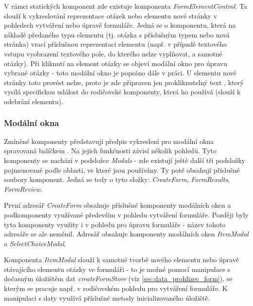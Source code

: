 		V rámci statických komponent zde existuje komponenta \textit{FormElementControl}. Ta slouží k vykreslování reprezentace otázek nebo elementu nové stránky v pohledech vytváření nebo úpravě formuláře. Jedná se o komponentu, která na základě předaného typu elementu (tj. otázka s příslušným typem nebo nová stránka) vrací příslušnou reprezentaci elementu (např. v případě textového vstupu vyobrazení textového pole, do kterého nelze vyplňovat, a samotné otázky). Při kliknutí na element otázky se objeví modální okno pro úpravu vybrané otázky - toto modální okno je popsáno dále v práci. U elementu nové stránky toto provést nelze, proto je zde připraven jen prokliknutelný text , který vysílá specifickou událost do rodičovské komponenty, která ho používá (slouží k odebrání elementu).
	
		\subsubsection{Modální okna} %
		Zmíněné komponenty představují předpis vykreslení pro modální okna spravovaná balíčkem . Na jejich funkčnosti závisí několik pohledů. Tyto komponenty se nachází v podsložce \textit{Modals} - zde existují ještě další tři podsložky pojmenované podle oblasti, ve které jsou používány. Ty poté obsahují příslušné soubory komponent. Jedná se tedy o tyto složky: \textit{CreateForm}, \textit{FormResults}, \textit{FormReview}. 
		
			První adresář \textit{CreateForm} obsahuje příslušné komponenty modálních oken a podkomponenty využívané především v pohledu vytváření formuláře. Později byly tyto komponenty využity i v pohledu pro úpravu formuláře - název tohoto adresáře se ale neměnil. Adresář obsahuje komponenty modálních oken \textit{ItemModal} a \textit{SelectChoiceModal}.
			
			Komponenta \textit{ItemModal} slouží k samotné tvorbě nového elementu nebo úpravě stávajícího elementu otázky ve formuláři - to je možné pomocí manipulace s dočasným úložištěm dat \textit{createFormStore} (viz \ref{sec:data_prohlizec_form}), se kterým se pracuje např. v rodičovském pohledu pro vytváření formuláře. K manipulaci s daty využívá příslušné metody inicializovaného úložiště.
			
